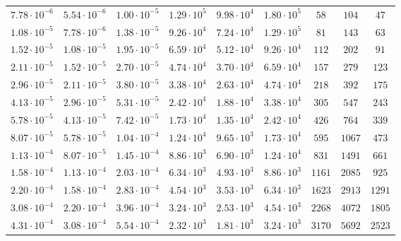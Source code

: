 \documentclass[draft,linenumbers]{agujournal2018}
\begin{document}
\begin{table}
\begin{tabular}{c c c c c c c c c}
$7.78\cdot 10^{-6}$ & $5.54\cdot 10^{-6}$ & $1.00\cdot 10^{-5}$ & $1.29\cdot 10^{5}$ & $9.98\cdot 10^{4}$ & $1.80\cdot 10^{5}$ & $        58$ & $       104$ & $     47$\\
$1.08\cdot 10^{-5}$ & $7.78\cdot 10^{-6}$ & $1.38\cdot 10^{-5}$ & $9.26\cdot 10^{4}$ & $7.24\cdot 10^{4}$ & $1.29\cdot 10^{5}$ & $        81$ & $       143$ & $     63$\\
$1.52\cdot 10^{-5}$ & $1.08\cdot 10^{-5}$ & $1.95\cdot 10^{-5}$ & $6.59\cdot 10^{4}$ & $5.12\cdot 10^{4}$ & $9.26\cdot 10^{4}$ & $       112$ & $       202$ & $     91$\\
$2.11\cdot 10^{-5}$ & $1.52\cdot 10^{-5}$ & $2.70\cdot 10^{-5}$ & $4.74\cdot 10^{4}$ & $3.70\cdot 10^{4}$ & $6.59\cdot 10^{4}$ & $       157$ & $       279$ & $    123$\\
$2.96\cdot 10^{-5}$ & $2.11\cdot 10^{-5}$ & $3.80\cdot 10^{-5}$ & $3.38\cdot 10^{4}$ & $2.63\cdot 10^{4}$ & $4.74\cdot 10^{4}$ & $       218$ & $       392$ & $    175$\\
$4.13\cdot 10^{-5}$ & $2.96\cdot 10^{-5}$ & $5.31\cdot 10^{-5}$ & $2.42\cdot 10^{4}$ & $1.88\cdot 10^{4}$ & $3.38\cdot 10^{4}$ & $       305$ & $       547$ & $    243$\\
$5.78\cdot 10^{-5}$ & $4.13\cdot 10^{-5}$ & $7.42\cdot 10^{-5}$ & $1.73\cdot 10^{4}$ & $1.35\cdot 10^{4}$ & $2.42\cdot 10^{4}$ & $       426$ & $       764$ & $    339$\\
$8.07\cdot 10^{-5}$ & $5.78\cdot 10^{-5}$ & $1.04\cdot 10^{-4}$ & $1.24\cdot 10^{4}$ & $9.65\cdot 10^{3}$ & $1.73\cdot 10^{4}$ & $       595$ & $      1067$ & $    473$\\
$1.13\cdot 10^{-4}$ & $8.07\cdot 10^{-5}$ & $1.45\cdot 10^{-4}$ & $8.86\cdot 10^{3}$ & $6.90\cdot 10^{3}$ & $1.24\cdot 10^{4}$ & $       831$ & $      1491$ & $    661$\\
$1.58\cdot 10^{-4}$ & $1.13\cdot 10^{-4}$ & $2.03\cdot 10^{-4}$ & $6.34\cdot 10^{3}$ & $4.93\cdot 10^{3}$ & $8.86\cdot 10^{3}$ & $      1161$ & $      2085$ & $    925$\\
$2.20\cdot 10^{-4}$ & $1.58\cdot 10^{-4}$ & $2.83\cdot 10^{-4}$ & $4.54\cdot 10^{3}$ & $3.53\cdot 10^{3}$ & $6.34\cdot 10^{3}$ & $      1623$ & $      2913$ & $   1291$\\
$3.08\cdot 10^{-4}$ & $2.20\cdot 10^{-4}$ & $3.96\cdot 10^{-4}$ & $3.24\cdot 10^{3}$ & $2.53\cdot 10^{3}$ & $4.54\cdot 10^{3}$ & $      2268$ & $      4072$ & $   1805$\\
$4.31\cdot 10^{-4}$ & $3.08\cdot 10^{-4}$ & $5.54\cdot 10^{-4}$ & $2.32\cdot 10^{3}$ & $1.81\cdot 10^{3}$ & $3.24\cdot 10^{3}$ & $      3170$ & $      5692$ & $   2523$\\

\end{tabular}
\end{table}
\end{document}
